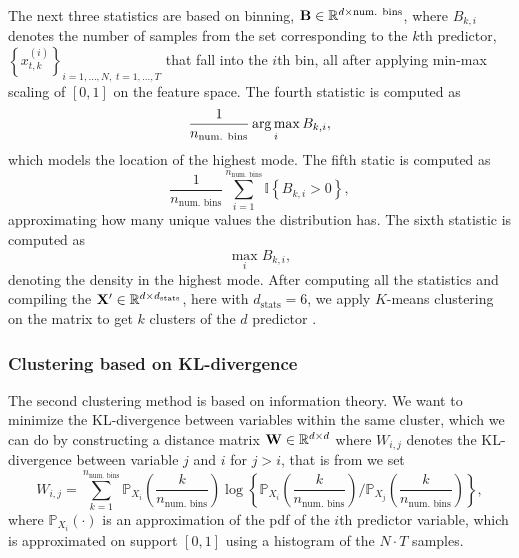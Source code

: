 \documentclass{statsmsc}
\begin{document}
The next three statistics are based on binning, $\mathbf{B} \in \mathbb{R}^{d \times \textrm{num. bins}}$,
where $B_{k,i}$ denotes the number of samples from the set corresponding to the
$k$th predictor, $\left\{x_{t,k}^{(i)} \right\}_{i=1,\dots,N,\;t=1,\dots,T}$
that fall into the $i$th bin, all after applying min-max scaling of $[0,1]$ on the feature
space. The fourth statistic is computed as
\begin{equation}
    \frac{1}{n_{\textrm{num. bins}}}  \operatorname*{arg\,max}_{i} B_{k,i},
\end{equation}
which models the location of the highest mode.
The fifth static is computed as
\begin{equation}
    \frac{1}{n_{\textrm{num. bins}}}  \sum^{n_{\textrm{num. bins}}}_{i=1} \mathbb{I}\left\{ 
        B_{k,i} > 0
    \right\},
\end{equation}
approximating how many unique values the distribution has. The sixth statistic is computed as
\begin{equation}
     \max_{i} B_{k,i},
\end{equation}
denoting the density in the highest mode.
After computing all the statistics and compiling the $\mathbf{X}' \in \mathbb{R}^{d \times d_{\textrm{stats}}}$,
here with $d_{\textrm{stats}}=6$, we apply $K$-means clustering on the matrix to get $k$ clusters
of the $d$ predictor \citep{kmeans}.

\subsubsection{Clustering based on KL-divergence}%
\label{sub:Clustering based on KL-divergence}

The second clustering method is based on information theory. We want to minimize the KL-divergence
between variables within the same cluster, which we can do by constructing a
distance matrix $\mathbf{W} \in \mathbb{R}^{d \times d}$ where $W_{i,j}$ denotes the
\ac{KL-divergence} between variable $j$ and $i$ for $j > i$, that is
from \citep{mackay} we set
\begin{equation}
    W_{i,j}= \sum^{n_{\textrm{num. bins}}}_{k=1} \mathbb{P}_{X_i}\left( \frac{k}{n_{\textrm{num. bins}}}  \right)
    \log\left\{ 
    \mathbb{P}_{X_i}\left( \frac{k}{n_{\textrm{num. bins}}}  \right) \bigg/
    \mathbb{P}_{X_j}\left( \frac{k}{n_{\textrm{num. bins}}}  \right)
\right\},
\end{equation}
where $\mathbb{P}_{X_i}(\cdot)$ is an approximation of the \ac{pdf} of the $i$th predictor variable,
which is approximated on support $[0,1]$ using a histogram of the $N \cdot T$ samples.
\end{document}
